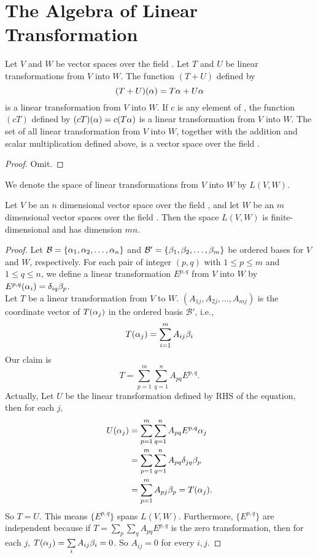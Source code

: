 \documentclass{mynotes}
\begin{document}
\section{The Algebra of Linear Transformation}
\begin{theorem}
Let $V$ and $W$ be vector spaces over the field \F. Let $T$ and $U$ be linear transformations from $V$ into $W$. The function $(T+U)$ defined by $$(T+U)(\alpha)=T\alpha+U\alpha$$is a linear transformation from $V$ into $W$. If $c$ is any element of \F, the function $(cT)$ defined by $(cT)(\alpha) = c(T\alpha)$ is a linear transformation from $V$ into $W$. The set of all linear transformation from $V$ into $W$, together with the addition and scalar multiplication defined above, is a vector space over the field \F.
\end{theorem}
\begin{proof}Omit.\end{proof}
\begin{remark}
We denote the space of linear transformations from $V$ into $W$ by $L(V,W)$.
\end{remark}
\begin{theorem}\label{mnthm}
Let $V$ be an $n$ dimensional vector space over the field \F, and let $W$ be an $m$ dimensional vector spaces over the field \F. Then the space $L(V,W)$ is finite-dimensional and has dimension $mn$.
\end{theorem}
\begin{proof}
Let $\mathcal{B} = \{\alpha_1,\alpha_2,\ldots,\alpha_n\}$ and $\mathcal{B}'= \{\beta_1,\beta_2,\ldots,\beta_m\}$ be ordered bases for $V$ and $W$, respectively. For each pair of integer $(p,q)$ with $1\leq p\leq m$ and $1\leq q\leq n$, we define a linear transformation $E^{p,q}$ from $V$ into $W$ by $E^{p,q}(\alpha_i) = \delta_{iq}\beta_p$.\\ Let $T$ be a linear transformation from $V$ to $W$. $(A_{1j},A_{2j},\ldots,A_{mj})$ is the coordinate vector of $T(\alpha_j)$ in the ordered basis $\mathcal{B}'$, i.e., $$T(\alpha_j) = \sum_{i=1}^mA_{ij}\beta_i$$ Our claim is $$T=\sum_{p=1}^m\sum_{q=1}^nA_{pq}E^{p,q}.$$Actually, Let $U$ be the linear transformation defined by RHS of the equation, then for each $j$, 
\begin{align*}U(\alpha_j) &= \sum_{p=1}^m\sum_{q=1}^nA_{pq}E^{p,q}\alpha_j\\ &= \sum_{p=1}^m\sum_{q=1}^nA_{pq}\delta_{jq}\beta_p\\ &=\sum_{p=1}^mA_{pj}\beta_p = T(\alpha_j).\end{align*}So $T=U.$ This means $\{E^{p,q}\}$ spans $L(V,W)$. Furthermore, $\{E^{p,q}\}$ are independent because if $T=\sum\limits_{p}\sum\limits_{q}A_{pq}E^{p,q}$ is the zero transformation, then for each $j$, $T(\alpha_j)= \sum\limits_iA_{ij}\beta_i=0$. So $A_{ij}=0$ for every $i,j$.
\end{proof}
\end{document}
